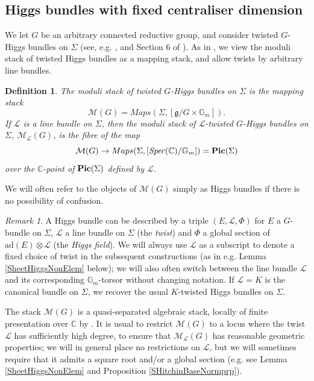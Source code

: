 \documentclass{amsart}
\newtheorem{definition}[theorem]{Definition}
\theoremstyle{remark}
\newtheorem{remark}[theorem]{Remark}
\numberwithin{theorem}{section}
\numberwithin{equation}{section}
\begin{document}
\subsection{Higgs bundles with fixed centraliser dimension}\label{SheetHiggssbn}
We let $G$ be an arbitrary connected reductive group, and consider twisted $G$-Higgs bundles on $\Sigma$ (see, e.g. \cite{Hitchin1}, \cite{Hitchin2} and Section 6 of \cite{Simpson1}). As in \cite{Ngo1}, we view the moduli stack of twisted Higgs bundles as a mapping stack, and allow twists by arbitrary line bundles.

\begin{definition}\label{HiggsModuliStackdef}
    The \emph{moduli stack of twisted $G$-Higgs bundles on $\Sigma$} is the mapping stack
    \begin{equation}\label{HiggsModuliStack1eqn}
        \mathcal M(G) = Maps(\Sigma,[\mathfrak{g}/G\times{\mathbb{G}_m}]).
    \end{equation}
    If $\mathcal L$ is a line bundle on $\Sigma$, then the \emph{moduli stack of $\mathcal L$-twisted $G$-Higgs bundles on $\Sigma$}, $\mathcal M_\mathcal L(G)$, is the fibre of the map
    \begin{equation}\label{HiggsModuliStack2eqn}
        \mathcal M(G) \rightarrow Maps(\Sigma,[\text{\emph{Spec}}( \mathbb{C})/\mathbb{G}_m]) = {\bf Pic}(\Sigma)
    \end{equation}
    over the $\mathbb{C}$-point of ${\bf Pic}(\Sigma)$ defined by $\mathcal L$.
\end{definition}

We will often refer to the objects of $\mathcal M(G)$ simply as Higgs bundles if there is no possibility of confusion.

\begin{remark}\label{HiggsModuliStackrmk}
    A Higgs bundle can be described by a triple $(E, \mathcal L, \Phi)$ for $E$ a $G$-bundle on $\Sigma$, $\mathcal L$ a line bundle on $\Sigma$ (the \emph{twist}) and $\Phi$ a global section of $\text{ad}(E) \otimes \mathcal L$ (the \emph{Higgs field}). We will always use $\mathcal L$ as a subscript to denote a fixed choice of twist in the subsequent constructions (as in e.g. Lemma \ref{SheetHiggsNonElem} below); we will also often switch between the line bundle $\mathcal L$ and its corresponding $\mathbb{G}_m$-torsor without changing notation. If $\mathcal L = K$ is the canonical bundle on $\Sigma$, we recover the usual $K$-twisted Higgs bundles on $\Sigma$.

    The stack $\mathcal M(G)$ is a quasi-separated algebraic stack, locally of finite presentation over $\mathbb{C}$ by \cite[Theorem 1.2]{HR}. It is usual to restrict $\mathcal M(G)$ to a locus where the twist $\mathcal L$ has sufficiently high degree, to ensure that $\mathcal M_{\mathcal L}(G)$ has reasonable geometric properties; we will in general place no restrictions on $\mathcal L$, but we will sometimes require that it admits a square root and/or a global section (e.g. see Lemma \ref{SheetHiggsNonElem} and Proposition \ref{SHitchinBaseNormprp}).
\end{remark}
\end{document}

